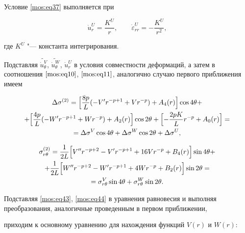 Условие \eqref{mos:eq37} выполняется при

\begin{equation}

\label{mos:eq42}

\dot{u}_r^{U}=\frac {K^U} {r}, \qquad \dot{\varepsilon}_{rr}^{U}=-\frac{K^U}{r^2},

\end{equation}

где $K^U$ "--- константа интегрирования.



Подставляя $\widetilde{\dot{u}_{\theta}^{V}} $, $\widetilde{\dot{u}_{\theta}^{W}} $, $\dot{u}^{U}_r $ в условия совместности деформаций, а затем в соотношения $\eqref{mos:eq10}$, $ \eqref{mos:eq11}$,  аналогично случаю первого приближения имеем

\begin{multline}

\label{mos:eq43}

\Delta\sigma^{(2)}=\Bigl[\frac{8p}{L}(-V' r^{-p+1}+Vr^{-p})+A_4(r)\Bigr]\cos{4\theta}+\\+

\Bigl[\frac{4p}{L}(-W' r^{-p+1}+Wr^{-p})+A_2(r)\Bigr]\cos{2\theta}+\Bigl[-\frac{2pK}{L}r^{-p}+A_0(r)\Bigr]=\\

=\Delta\sigma^V\cos{4\theta}+\Delta\sigma^W\cos{2\theta}+\Delta\sigma^{U},

\end{multline}

\begin{multline}

\label{mos:eq44}

\sigma_{r\theta}^{(2)}=\frac1{2L}\Bigl[V'' r^{-p+2}-V' r^{-p+1}+16Vr^{-p}+B_4(r)\Bigr]\sin{4\theta}+\\

+\frac1{2L}\Bigl[W'' r^{-p+2}-W' r^{-p+1}+4Wr^{-p}+B_2(r)\Bigr]\sin{2\theta} =\\

=\sigma_{r\theta}^{V}\sin{4\theta}+\sigma_{r\theta}^{W}\sin{2\theta}.

\end{multline}

\pagebreak



Подставляя \eqref{mos:eq43},  \eqref{mos:eq44} в уравнения равновесия и выполняя преобразования, аналогичные проведенным в первом приближении,

приходим к основному уравнению для нахождения функций $V(r)$  и $W(r)$:

